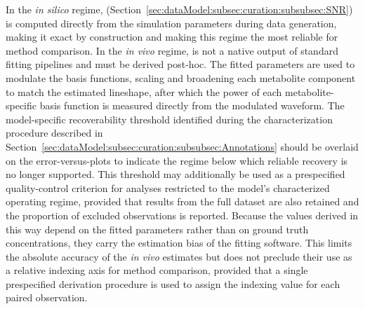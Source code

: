 In the \textit{in silico} regime, \mSNR (Section~\ref{sec:dataModel:subsec:curation:subsubsec:SNR}) is computed directly from the simulation parameters during data generation, making it exact by construction and making this regime the most reliable for method comparison. In the \textit{in vivo} regime, \mSNR is not a native output of standard fitting pipelines and must be derived post-hoc. The fitted parameters are used to modulate the basis functions, scaling and broadening each metabolite component to match the estimated lineshape, after which the power of each metabolite-specific basis function is measured directly from the modulated waveform. The model-specific \mSNR recoverability threshold identified during the characterization procedure described in Section~\ref{sec:dataModel:subsec:curation:subsubsec:Annotations} should be overlaid on the error-versus-\mSNR plots to indicate the regime below which reliable recovery is no longer supported. This threshold may additionally be used as a prespecified quality-control criterion for analyses restricted to the model's characterized operating regime, provided that results from the full dataset are also retained and the proportion of excluded observations is reported. Because the \mSNR values derived in this way depend on the fitted parameters rather than on ground truth concentrations, they carry the estimation bias of the fitting software. This limits the absolute accuracy of the \textit{in vivo} \mSNR estimates but does not preclude their use as a relative indexing axis for method comparison, provided that a single prespecified derivation procedure is used to assign the indexing value for each paired observation. 


